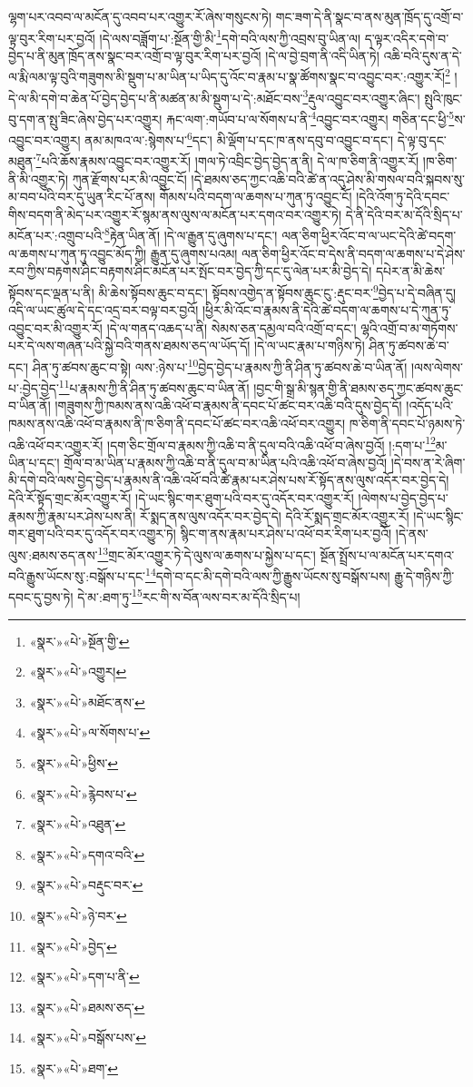 ལྷག་པར་འབབ་ལ་མངོན་དུ་འབབ་པར་འགྱུར་རོ་ཞེས་གསུངས་ཏེ། གང་ཟག་དེ་ནི་སྣང་བ་ནས་མུན་ཁྲོད་དུ་འགྲོ་བ་ལྟ་བུར་རིག་པར་བྱའོ། །དེ་ལས་བཟློག་པ་:སྔོན་གྱི་མི་\footnote{«སྣར་»«པེ་»སྔོན་གྱི་}དགེ་བའི་ལས་ཀྱི་འབྲས་བུ་ཡིན་ལ། ད་ལྟར་འདིར་དགེ་བ་བྱེད་པ་ནི་མུན་ཁྲོད་ནས་སྣང་བར་འགྲོ་བ་ལྟ་བུར་རིག་པར་བྱའོ། །དེ་ལ་བྱེ་བྲག་ནི་འདི་ཡིན་ཏེ། འཆི་བའི་དུས་ན་དེ་ལ་རྨི་ལམ་ལྟ་བུའི་གཟུགས་མི་སྡུག་པ་མ་ཡིན་པ་ཡིད་དུ་འོང་བ་རྣམ་པ་སྣ་ཚོགས་སྣང་བ་འབྱུང་བར་:འགྱུར་རོ།\footnote{«སྣར་»«པེ་»འགྱུར།} །དེ་ལ་མི་དགེ་བ་ཆེན་པོ་བྱེད་བྱེད་པ་ནི་མཚན་མ་མི་སྡུག་པ་དེ་:མཐོང་བས་\footnote{«སྣར་»«པེ་»མཐོང་ནས་}རྡུལ་འབྱུང་བར་འགྱུར་ཞིང་། སྤུའི་ཁུང་བུ་དག་ན་སྤུ་ཟིང་ཞེས་བྱེད་པར་འགྱུར། རྐང་ལག་:གཡོབ་པ་ལ་སོགས་པ་ནི་\footnote{«སྣར་»«པེ་»ལ་སོགས་པ་}འབྱུང་བར་འགྱུར། གཅིན་དང་ཕྱི་\footnote{«སྣར་»«པེ་»ཕྱིས་}ས་འབྱུང་བར་འགྱུར། ནམ་མཁའ་ལ་:སྙེགས་པ་\footnote{«སྣར་»«པེ་»རྙེབས་པ་}དང་། མི་ལྡོག་པ་དང་ཁ་ནས་དབུ་བ་འབྱུང་བ་དང་། དེ་ལྟ་བུ་དང་མཐུན་\footnote{«སྣར་»«པེ་»འཐུན་}པའི་ཆོས་རྣམས་འབྱུང་བར་འགྱུར་རོ། །གལ་ཏེ་འབྲིང་བྱེད་བྱེད་ན་ནི། དེ་ལ་ཁ་ཅིག་ནི་འགྱུར་རོ། །ཁ་ཅིག་ནི་མི་འགྱུར་ཏེ། ཀུན་རྫོགས་པར་མི་འབྱུང་ངོ། །དེ་ཐམས་ཅད་ཀྱང་འཆི་བའི་ཚེ་ན་འདུ་ཤེས་མི་གསལ་བའི་སྐབས་སུ་མ་བབ་པའི་བར་དུ་ཡུན་རིང་པོ་ནས། གོམས་པའི་བདག་ལ་ཆགས་པ་ཀུན་ཏུ་འབྱུང་ངོ། །དེའི་འོག་ཏུ་དེའི་དབང་གིས་བདག་ནི་མེད་པར་འགྱུར་རོ་སྙམ་ནས་ལུས་ལ་མངོན་པར་དགའ་བར་འགྱུར་ཏེ། དེ་ནི་དེའི་བར་མ་དོའི་སྲིད་པ་མངོན་པར་:འགྲུབ་པའི་\footnote{«སྣར་»«པེ་»དགའ་བའི་}རྟེན་ཡིན་ནོ། །དེ་ལ་རྒྱུན་དུ་ཞུགས་པ་དང་། ལན་ཅིག་ཕྱིར་འོང་བ་ལ་ཡང་དེའི་ཚེ་བདག་ལ་ཆགས་པ་ཀུན་ཏུ་འབྱུང་མོད་ཀྱི། རྒྱུན་དུ་ཞུགས་པའམ། ལན་ཅིག་ཕྱིར་འོང་བ་དེས་ནི་བདག་ལ་ཆགས་པ་དེ་ཤེས་རབ་ཀྱིས་བརྟགས་ཤིང་བརྟགས་ཤིང་མངོན་པར་སྤོང་བར་བྱེད་ཀྱི་དང་དུ་ལེན་པར་མི་བྱེད་དེ། དཔེར་ན་མི་ཆེས་སྟོབས་དང་ལྡན་པ་ནི། མི་ཆེས་སྟོབས་ཆུང་བ་དང་། སྟོབས་འགྱེད་ན་སྟོབས་ཆུང་ངུ་:རྡུང་བར་\footnote{«སྣར་»«པེ་»བརྡུང་བར་}བྱེད་པ་དེ་བཞིན་དུ། འདི་ལ་ཡང་ཚུལ་དེ་དང་འདྲ་བར་བལྟ་བར་བྱའོ། །ཕྱིར་མི་འོང་བ་རྣམས་ནི་དེའི་ཚེ་བདག་ལ་ཆགས་པ་དེ་ཀུན་ཏུ་འབྱུང་བར་མི་འགྱུར་རོ། །དེ་ལ་གནད་འཆད་པ་ནི། སེམས་ཅན་དམྱལ་བའི་འགྲོ་བ་དང་། ལྷའི་འགྲོ་བ་མ་གཏོགས་པར་དེ་ལས་གཞན་པའི་སྐྱེ་བའི་གནས་ཐམས་ཅད་ལ་ཡོད་དོ། །དེ་ལ་ཡང་རྣམ་པ་གཉིས་ཏེ། ཤིན་ཏུ་ཚབས་ཆེ་བ་དང་། ཤིན་ཏུ་ཚབས་ཆུང་བ་སྟེ། ལས་:ཉེས་པ་\footnote{«སྣར་»«པེ་»ཉེ་བར་}བྱེད་བྱེད་པ་རྣམས་ཀྱི་ནི་ཤིན་ཏུ་ཚབས་ཆེ་བ་ཡིན་ནོ། །ལས་ལེགས་པ་:བྱེད་བྱེད་\footnote{«སྣར་»«པེ་»བྱེད་}པ་རྣམས་ཀྱི་ནི་ཤིན་ཏུ་ཚབས་ཆུང་བ་ཡིན་ནོ། །བྱང་གི་སྒྲ་མི་སྙན་གྱི་ནི་ཐམས་ཅད་ཀྱང་ཚབས་ཆུང་བ་ཡིན་ནོ། །གཟུགས་ཀྱི་ཁམས་ནས་འཆི་འཕོ་བ་རྣམས་ནི་དབང་པོ་ཚང་བར་འཆི་བའི་དུས་བྱེད་དོ། །འདོད་པའི་ཁམས་ནས་འཆི་འཕོ་བ་རྣམས་ནི་ཁ་ཅིག་ནི་དབང་པོ་ཚང་བར་འཆི་འཕོ་བར་འགྱུར། ཁ་ཅིག་ནི་དབང་པོ་ཉམས་ཏེ་འཆི་འཕོ་བར་འགྱུར་རོ། །དག་ཅིང་གྲོལ་བ་རྣམས་ཀྱི་འཆི་བ་ནི་དུལ་བའི་འཆི་འཕོ་བ་ཞེས་བྱའོ། །:དག་པ་\footnote{«སྣར་»«པེ་»དག་པ་ནི་}མ་ཡིན་པ་དང་། གྲོལ་བ་མ་ཡིན་པ་རྣམས་ཀྱི་འཆི་བ་ནི་དུལ་བ་མ་ཡིན་པའི་འཆི་འཕོ་བ་ཞེས་བྱའོ། །དེ་བས་ན་རེ་ཞིག་མི་དགེ་བའི་ལས་བྱེད་བྱེད་པ་རྣམས་ནི་འཆི་འཕོ་བའི་ཚེ་རྣམ་པར་ཤེས་པས་རོ་སྟོད་ནས་ལུས་འདོར་བར་བྱེད་དེ། དེའི་རོ་སྟོད་གྲང་མོར་འགྱུར་རོ། །དེ་ཡང་སྙིང་གར་ཐུག་པའི་བར་དུ་འདོར་བར་འགྱུར་རོ། །ལེགས་པ་བྱེད་བྱེད་པ་རྣམས་ཀྱི་རྣམ་པར་ཤེས་པས་ནི། རོ་སྨད་ནས་ལུས་འདོར་བར་བྱེད་དེ། དེའི་རོ་སྨད་གྲང་མོར་འགྱུར་རོ། །དེ་ཡང་སྙིང་གར་ཐུག་པའི་བར་དུ་འདོར་བར་འགྱུར་ཏེ། སྙིང་ག་ནས་རྣམ་པར་ཤེས་པ་འཕོ་བར་རིག་པར་བྱའོ། །དེ་ནས་ལུས་:ཐམས་ཅད་ནས་\footnote{«སྣར་»«པེ་»ཐམས་ཅད་}གྲང་མོར་འགྱུར་ཏེ་དེ་ལུས་ལ་ཆགས་པ་སྐྱེས་པ་དང་། སྔོན་སྤྲོས་པ་ལ་མངོན་པར་དགའ་བའི་རྒྱུས་ཡོངས་སུ་:བསྒོས་པ་དང་\footnote{«སྣར་»«པེ་»བསྒོས་པས་}དགེ་བ་དང་མི་དགེ་བའི་ལས་ཀྱི་རྒྱུས་ཡོངས་སུ་བསྒོས་པས། རྒྱུ་དེ་གཉིས་ཀྱི་དབང་དུ་བྱས་ཏེ། དེ་མ་:ཐག་ཏུ་\footnote{«སྣར་»«པེ་»ཐག་}རང་གི་ས་བོན་ལས་བར་མ་དོའི་སྲིད་པ། 